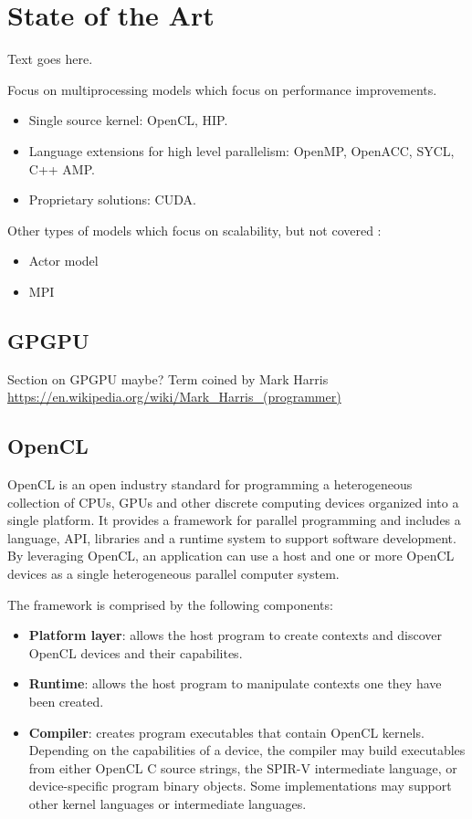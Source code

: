 \chapter{State of the Art}

Text goes here.

Focus on multiprocessing models which focus on performance improvements.

\begin{itemize}
    \item Single source kernel: OpenCL, HIP.
    \item Language extensions for high level parallelism: OpenMP, OpenACC, SYCL, C++ AMP.
    \item Proprietary solutions: CUDA.
\end{itemize}

Other types of models which focus on scalability, but not covered \cite{survey_programming_models}:

\begin{itemize}
    \item Actor model
    \item MPI
\end{itemize}

\section{GPGPU}
Section on GPGPU maybe? 
Term coined by Mark Harris \url{https://en.wikipedia.org/wiki/Mark_Harris_(programmer)}


\section{OpenCL}
OpenCL \cite{opencl_spec} is an open industry standard for programming a heterogeneous collection of CPUs, GPUs and other discrete computing devices organized into a single platform. It provides a framework for parallel programming and includes a language, API, libraries and a runtime system to support software development. By leveraging OpenCL, an application can use a host and one or more OpenCL devices as a single heterogeneous parallel computer system.

The framework is comprised by the following components:
\begin{itemize}
    \item \textbf{Platform layer}: allows the host program to create contexts and discover OpenCL devices and their capabilites.
    \item \textbf{Runtime}: allows the host program to manipulate contexts one they have been created.
    \item \textbf{Compiler}: creates program executables that contain OpenCL kernels. Depending on the capabilities of a device, the compiler may build executables from either OpenCL C source strings, the SPIR-V intermediate language, or device-specific program binary objects. Some implementations may support other kernel languages or intermediate languages.
\end{itemize}

